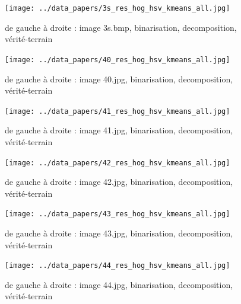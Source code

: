 \documentclass{book}
\begin{document}
\begin{figure}[H]
\begin{center}
\texttt{[image: ../data\_papers/3s\_res\_hog\_hsv\_kmeans\_all.jpg]}
\end{center}
\caption{de gauche à droite : image 3s.bmp, binarisation, decomposition, vérité-terrain}
\label{3s}
\end{figure}
\clearpage


\begin{figure}[H]
\begin{center}
\texttt{[image: ../data\_papers/40\_res\_hog\_hsv\_kmeans\_all.jpg]}
\end{center}
\caption{de gauche à droite : image 40.jpg, binarisation, decomposition, vérité-terrain}
\label{40}
\end{figure}
\clearpage


\begin{figure}[H]
\begin{center}
\texttt{[image: ../data\_papers/41\_res\_hog\_hsv\_kmeans\_all.jpg]}
\end{center}
\caption{de gauche à droite : image 41.jpg, binarisation, decomposition, vérité-terrain}
\label{41}
\end{figure}
\clearpage


\begin{figure}[H]
\begin{center}
\texttt{[image: ../data\_papers/42\_res\_hog\_hsv\_kmeans\_all.jpg]}
\end{center}
\caption{de gauche à droite : image 42.jpg, binarisation, decomposition, vérité-terrain}
\label{42}
\end{figure}
\clearpage


\begin{figure}[H]
\begin{center}
\texttt{[image: ../data\_papers/43\_res\_hog\_hsv\_kmeans\_all.jpg]}
\end{center}
\caption{de gauche à droite : image 43.jpg, binarisation, decomposition, vérité-terrain}
\label{43}
\end{figure}
\clearpage


\begin{figure}[H]
\begin{center}
\texttt{[image: ../data\_papers/44\_res\_hog\_hsv\_kmeans\_all.jpg]}
\end{center}
\caption{de gauche à droite : image 44.jpg, binarisation, decomposition, vérité-terrain}
\label{44}
\end{figure}
\clearpage
\end{document}
